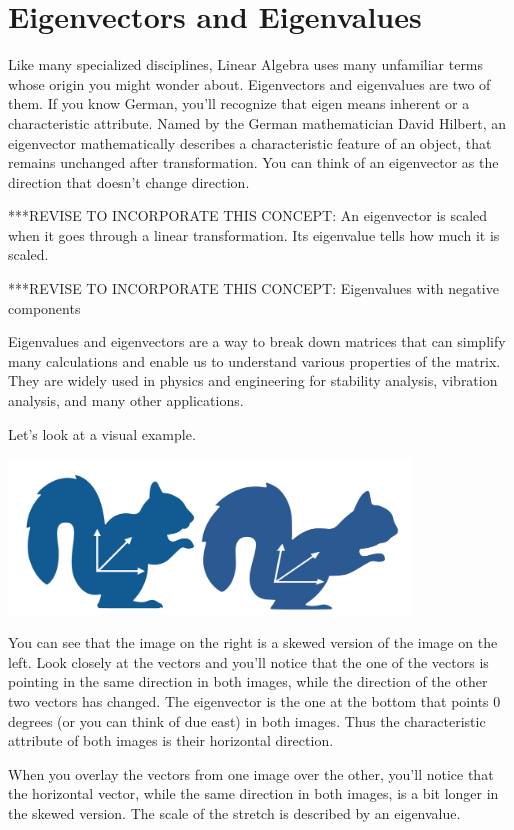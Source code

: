 \chapter{Eigenvectors and Eigenvalues}


Like many specialized disciplines, Linear Algebra uses many unfamiliar terms whose origin you might wonder about. Eigenvectors and eigenvalues are two of them. If you know German, you’ll recognize that eigen means inherent or a characteristic attribute. Named by the German mathematician David Hilbert, an eigenvector mathematically describes a characteristic feature of an object, that remains unchanged after transformation. You can think of an eigenvector as the direction that doesn’t change direction. 

***REVISE TO INCORPORATE THIS CONCEPT: An eigenvector is scaled when it goes through a linear transformation. Its eigenvalue tells how much it is scaled.

***REVISE TO INCORPORATE THIS CONCEPT: Eigenvalues with negative components

Eigenvalues and eigenvectors are a way to break down matrices that can simplify many calculations and enable us to understand various properties of the matrix. They are widely used in physics and engineering for stability analysis, vibration analysis, and many other applications.  

Let’s look at a visual example.

\includegraphics[width=0.8\textwidth]{eigensquirrel.png}

You can see that the  image on the right is a skewed version of the image on the left. Look closely at the vectors and you’ll notice that the one of the vectors is pointing in the same direction in both images, while the direction of the other two vectors has changed. The eigenvector is the one at the bottom that points 0 degrees (or you can think of due east) in both images. Thus the characteristic attribute of both images is their horizontal direction.

When you overlay the vectors from one image over the other, you’ll notice that the horizontal vector, while the same direction in both images, is a bit longer in the skewed version. The scale of the stretch is described by an eigenvalue.

